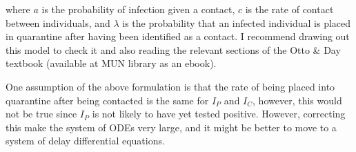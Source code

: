 \documentclass[12pt]{article}
\begin{document}
where $a$ is the probability of infection given a contact, $c$ is the rate of contact between individuals, and $\lambda$ is the probability that an infected individual is placed in quarantine after having been identified as a contact. I recommend drawing out this model to check it and also reading the relevant sections of the Otto \& Day textbook (available at MUN library as an ebook).

One assumption of the above formulation is that the rate of being placed into quarantine after being contacted is the same for $I_P$ and $I_C$, however, this would not be true since $I_P$ is not likely to have yet tested positive. However, correcting this make the system of ODEs very large, and it might be better to move to a system of delay differential equations.
\end{document}
